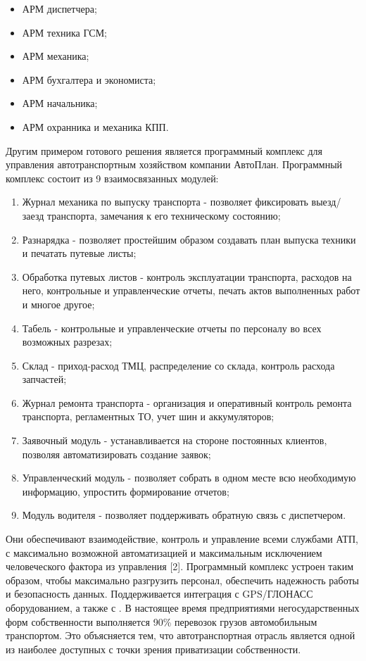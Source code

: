 \documentclass{lstu-diploma}
\begin{document}
\begin{itemize}
	\item АРМ диспетчера;
	\item АРМ техника ГСМ;
	\item АРМ механика;
	\item АРМ бухгалтера и экономиста;
	\item АРМ начальника;
	\item АРМ охранника и механика КПП.
\end{itemize}

Другим примером готового решения является программный комплекс для управления
автотранспортным хозяйством  компании АвтоПлан. Программный
комплекс состоит из 9 взаимосвязанных модулей:
\begin{enumerate}
	\item Журнал механика по выпуску транспорта - позволяет фиксировать
		выезд/заезд транспорта, замечания к его техническому состоянию;
	\item Разнарядка - позволяет простейшим образом создавать план выпуска
		техники и печатать путевые листы;
	\item Обработка путевых листов - контроль эксплуатации транспорта,
		расходов на него, контрольные и управленческие отчеты, печать актов
		выполненных работ и многое другое;
	\item Табель - контрольные и управленческие отчеты по персоналу во всех
		возможных разрезах;
	\item Склад - приход-расход ТМЦ, распределение со склада, контроль расхода
		запчастей;
	\item Журнал ремонта транспорта - организация и оперативный контроль
		ремонта транспорта, регламентных ТО, учет шин и аккумуляторов;
	\item Заявочный модуль - устанавливается на стороне постоянных клиентов,
		позволяя автоматизировать создание заявок;
	\item Управленческий модуль - позволяет собрать в одном месте всю
		необходимую информацию, упростить формирование отчетов;
	\item Модуль водителя - позволяет поддерживать обратную связь с
		диспетчером.
\end{enumerate}

Они обеспечивают взаимодействие, контроль и управление всеми службами АТП, с
максимально возможной автоматизацией и максимальным исключением человеческого
фактора из управления [2].
Программный комплекс устроен таким образом, чтобы максимально разгрузить
персонал, обеспечить надежность работы и безопасность данных.
Поддерживается интеграция с GPS/ГЛОНАСС оборудованием, а также с
.
В настоящее время предприятиями негосударственных форм собственности выполняется
90\% перевозок грузов автомобильным транспортом. Это объясняется тем, что
автотранспортная отрасль является одной из наиболее доступных с точки зрения
приватизации собственности.
\end{document}
